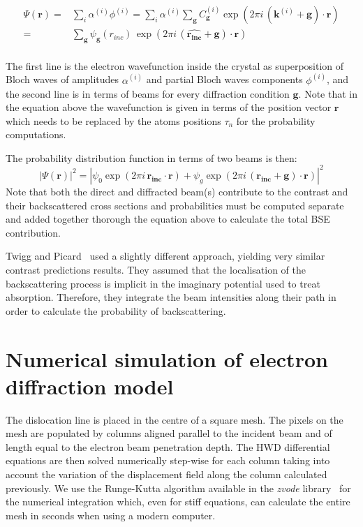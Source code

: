 \begin{equation}
\begin{split}
    \Psi(\mathbf{r})  = & \sum_i \alpha^{(i)} \phi^{(i)} =  \sum_i \alpha^{(i)} \sum_{\mathbf{g}} C_{\mathbf{g}}^{(i)} \exp(2\pi i \, (\mathbf{k}^{(i)}+\mathbf{g})\cdot \mathbf{r}) \\
                  = & \sum_{\mathbf{g}} \psi_{\mathbf{g}}(r_{inc}) \, \exp(2\pi i \, (\mathbf{\hat{r_{inc}}} + \mathbf{g})\cdot \mathbf{r})\\
\end{split}
\end{equation}


The first line is the electron wavefunction inside the crystal as superposition of Bloch waves of amplitudes  $\alpha^{(i)}$ and partial Bloch waves components $\phi^{(i)}$, and the second line is in terms of beams for every diffraction condition $\mathbf{g}$. Note that in the equation above the wavefunction is given in terms of the position vector $\mathbf{r}$ which needs to be replaced by the atoms positions $\tau_n$ for the probability computations. 

The probability distribution function in terms of two beams is then:
\begin{equation}
    |\Psi(\mathbf{r})|^2 = |\psi_0 \exp(2 \pi i \, \mathbf{r_{inc}}\cdot \mathbf{r}) + \psi_g \exp(2 \pi i \, (\mathbf{r_{inc}+\mathbf{g}})\cdot \mathbf{r})|^2
\end{equation}
Note that both the direct and diffracted beam(s) contribute to the contrast and their backscattered cross sections and probabilities must be computed separate and added together thorough the equation above to calculate the total BSE contribution.
 


Twigg and Picard~\cite{Twigg09} used a slightly different approach, yielding very similar contrast predictions results. They assumed that the localisation of the backscattering process is implicit in the imaginary potential used to treat absorption. Therefore, they integrate the beam intensities along their path in order to calculate the probability of backscattering.  


\section{ Numerical simulation of electron diffraction model}
\label{sec:numerical}
The dislocation line is placed in the centre of a square mesh. The pixels on the mesh are populated by columns aligned parallel to the incident beam and of length equal to the electron beam penetration depth. The HWD differential equations are then solved numerically step-wise for each column taking into account the variation of the displacement field along the column calculated previously. We use the Runge-Kutta algorithm available in the \textit{zvode} library~\cite{Hindmarsh85} for the numerical integration which, even for stiff equations, can calculate the entire mesh in seconds when using a modern computer.

